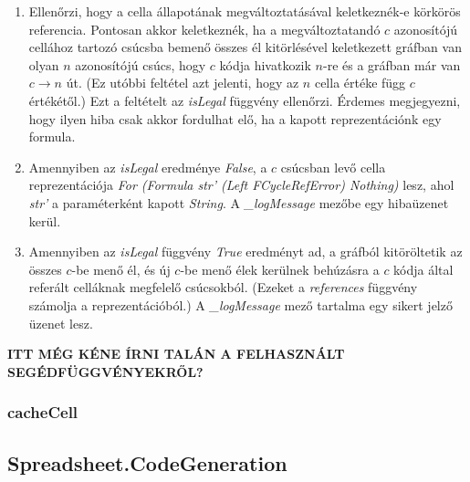 \begin{enumerate}
	\item Ellenőrzi, hogy a cella állapotának megváltoztatásával keletkeznék-e 		körkörös referencia. Pontosan akkor keletkeznék, ha a megváltoztatandó $c$ 	azonosítójú cellához tartozó csúcsba bemenő összes él kitörlésével keletkezett gráfban van olyan $n$ azonosítójú csúcs, hogy $c$ kódja hivatkozik $n$-re és a gráfban már van $c \rightarrow n$ út. (Ez utóbbi feltétel azt jelenti, hogy az $n$ cella értéke függ $c$ értékétől.) Ezt a feltételt az \textit{isLegal} függvény ellenőrzi. Érdemes megjegyezni, hogy ilyen hiba csak akkor fordulhat elő, ha a kapott reprezentációnk egy formula.
	\item Amennyiben az \textit{isLegal} eredménye \textit{False}, a $c$ csúcsban levő cella reprezentációja \textit{For (Formula str' (Left FCycleRefError) Nothing)} lesz, ahol \textit{str'} a paraméterként kapott \textit{String}. A \textit{\_logMessage} mezőbe egy hibaüzenet kerül.
	\item Amennyiben az \textit{isLegal} függvény \textit{True} eredményt ad, a gráfból kitöröltetik az összes $c$-be menő él, és új $c$-be menő élek kerülnek behúzásra a $c$ kódja által referált celláknak megfelelő csúcsokból. (Ezeket a \textit{references} függvény számolja a reprezentációból.) A \textit{\_logMessage} mező tartalma egy sikert jelző üzenet lesz.
\end{enumerate}

\textbf{ITT MÉG KÉNE ÍRNI TALÁN A FELHASZNÁLT SEGÉDFÜGGVÉNYEKRŐL?}

\subsubsection{cacheCell}

\subsection{Spreadsheet.CodeGeneration}